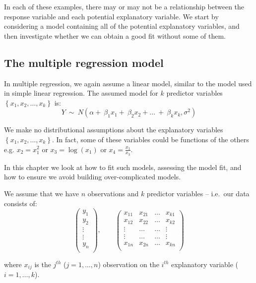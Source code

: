 \documentclass[12pt,a4paper,openany,twoside]{report}
\theoremstyle{definition}
\theoremstyle{remark}
\theoremstyle{plain}
\theoremstyle{definition}
\theoremstyle{definition}
\theoremstyle{definition}
\theoremstyle{remark}
\begin{document}
In each of these examples, there may or may not be a relationship
between the response variable and each potential explanatory variable.
We start by considering a model containing all of the potential
explanatory variables, and then investigate whether we can obtain a good
fit without some of them.

\hypertarget{mlrmodel}{%
\subsection{The multiple regression model}\label{mlrmodel}}

In multiple regression, we again assume a linear model, similar to
the model used in simple linear regression. The assumed model for \(k\) predictor variables
\(\left\{x_{1}, x_{2}, \ldots, x_{k}\right\}\) is:
\[Y\ \sim\ N(\alpha + \ \beta_{1}x_{1} + \ \beta_{2}x_{2} + ...\  + \ \beta_{k}x_{k}, \sigma^{2})\]

We make no distributional assumptions about the explanatory variables
\(\left\{x_{1}, x_{2}, \ldots, x_{k}\right\}\). In fact, some of
these variables could be functions of the others e.g.
\(x_{2} = x_{1}^{2}\) or \(x_{3} = \log{(x_{1})}\) or
\(x_{4} = \frac{x_{1}}{x_{3}}\).

In this chapter we look at how to fit such models, assessing the model
fit, and how to ensure we avoid building over-complicated models.

We assume that we have \(n\) observations and \(k\) predictor variables --
i.e.~our data consists of:
\[
\begin{pmatrix}
y_{1}\\
y_{2}\\
\vdots\\
\vdots\\
y_{n}\\
\end{pmatrix}, \qquad
\begin{pmatrix}
x_{11} & x_{21} & \ldots & x_{k1} \\
x_{12} & x_{22} & \ldots & x_{k2} \\
\vdots & \ldots & \ldots & \vdots \\
\vdots & \ldots & \ldots & \vdots \\
x_{1n} & x_{2n} & \ldots & x_{kn} \\
\end{pmatrix}
 \]

where \(x_{ij}\) is the \(j^{th}\) (\(j=1,\ldots, n\)) observation on the
\(i^{th}\) explanatory variable (\(i=1,\ldots, k\)).
\end{document}
